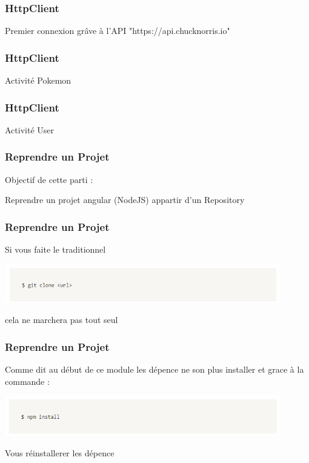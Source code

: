 \documentclass[10pt]{beamer}
\begin{document}
    \begin{frame}
        \frametitle{HttpClient}

        Premier connexion grâve à l'API "https://api.chucknorris.io"

    \end{frame}

    \begin{frame}
        \frametitle{HttpClient}

        Activité Pokemon

    \end{frame}

    \begin{frame}
        \frametitle{HttpClient}

        Activité User

    \end{frame}


    \begin{frame}
        \frametitle{Reprendre un Projet}

        Objectif de cette parti : \newline \newline

        Reprendre un projet angular (NodeJS) appartir d'un Repository

    \end{frame}

    \begin{frame}
        \frametitle{Reprendre un Projet}

        Si vous faite le traditionnel \newline


        \centering
        \includegraphics[width=12cm]{assets/gitclone}

        cela ne marchera pas tout seul

    \end{frame}

    \begin{frame}
        \frametitle{Reprendre un Projet}

        Comme dit au début de ce module les dépence ne son plus installer et grace à la commande : \newline


        \centering
        \includegraphics[width=12cm]{assets/npminsta}

        Vous réinstallerer les dépence

    \end{frame}
\end{document}
